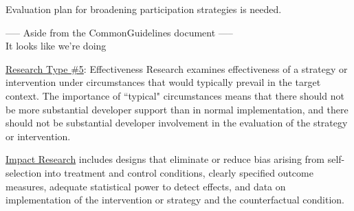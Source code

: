 \documentclass[12pt]{article}
\begin{document}
Evaluation plan for broadening participation strategies is needed.

\vspace{2em}
\noindent ----- Aside from the CommonGuidelines document -----\\
It looks like we're doing

\underline{Research Type \#5}: Effectiveness Research examines effectiveness of a strategy or intervention under circumstances that would typically prevail in the target context. The importance of ``typical" circumstances means that there should not be more substantial 
developer support than in normal implementation, and there should not be substantial developer involvement in the evaluation of the strategy or intervention.

\underline{Impact Research} includes designs that eliminate or reduce bias arising from self-selection into treatment and control 
conditions, clearly specified outcome measures, adequate statistical power to detect effects, and data on implementation of the intervention or strategy and the counterfactual condition.
\end{document}
